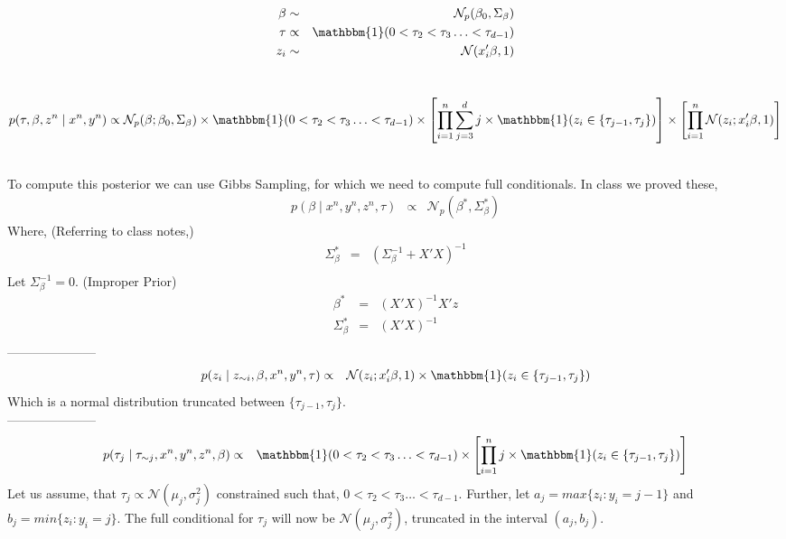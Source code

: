 \documentclass{article}
\begin{document}
\\
\begin{eqnarray*}
\beta &\sim& \mathcal{N}_p(\beta_0,\Sigma_{\beta})\\
\tau &\propto& \mathbbm{1}(0 < \tau_2 < \tau_3 \ldots < \tau_{d-1})\\
z_i &\sim& \mathcal{N}(x_i'\beta,1)
\end{eqnarray*}

\\

\begin{eqnarray*}
p(\tau,\beta,z^n \mid x^n,y^n) \propto \mathcal{N}_p(\beta;\beta_0,\Sigma_{\beta}) \times \mathbbm{1}(0 < \tau_2 < \tau_3 \ldots < \tau_{d-1}) \times \left[\prod_{i=1}^n{\sum_{j=3}^{d}{j \times \mathbbm{1}(z_i \in \{\tau_{j-1},\tau_j\})}}\right] \times \left[\prod_{i=1}^n{\mathcal{N}(z_i;x_i'\beta,1)}\right]
\end{eqnarray*}

\\

To compute this posterior we can use Gibbs Sampling, for which we need to compute full conditionals. In class we proved these,
\begin{eqnarray*}
p(\beta \mid x^n,y^n,z^n,\tau) &\propto& \mathcal{N}_p(\beta^*,\Sigma_{\beta}^*)
\end{eqnarray*}
Where, (Referring to class notes,)
\begin{eqnarray*}
\Sigma_{\beta}^* &=& (\Sigma_{\beta}^{-1} + X'X)^{-1}\\
\end{eqnarray*}
Let $\Sigma_{\beta}^{-1} = 0.$ (Improper Prior)
\begin{eqnarray*}
\beta^* &=& (X'X)^{-1}X'z\\
\Sigma_{\beta}^* &=& (X'X)^{-1}\\
\end{eqnarray*}
---------------------\\
\begin{eqnarray*}
p(z_i \mid z_{\sim i},\beta,x^n,y^n,\tau) &\propto& \mathcal{N}(z_i;x_i'\beta,1) \times \mathbbm{1}(z_i \in \{\tau_{j-1},\tau_j\})
\end{eqnarray*}
Which is a normal distribution truncated between $\{\tau_{j-1},\tau_j\}.$\\
---------------------\\
\begin{eqnarray*}
p(\tau_j \mid \tau_{\sim j},x^n,y^n,z^n,\beta) &\propto& \mathbbm{1}(0 < \tau_2 < \tau_3 \ldots < \tau_{d-1}) \times \left[\prod_{i=1}^n{j \times \mathbbm{1}(z_i \in \{\tau_{j-1},\tau_j\})}\right]
\end{eqnarray*}
Let us assume, that $\tau_j \propto \mathcal{N}(\mu_j,\sigma_j^2)$ constrained such that, $0 < \tau_2 < \tau_3 \ldots < \tau_{d-1}.$ Further, let $a_j = max\{z_i : y_i = j-1\}$ and $b_j = min\{z_i : y_i = j\}.$ The full conditional for $\tau_{j}$ will now be $\mathcal{N}(\mu_j,\sigma_j^2)$, truncated in the interval $(a_j,b_j).$\\
\end{document}
